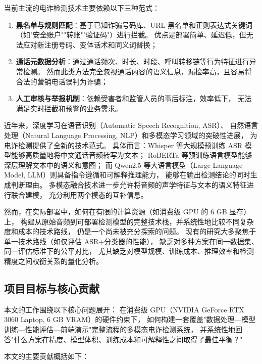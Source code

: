\documentclass[11pt,a4paper]{ctexart}
\begin{document}
当前主流的电诈检测技术主要依赖以下三种范式：

\begin{enumerate}[label=(\arabic*)]
  \item \textbf{黑名单与规则匹配}：基于已知诈骗号码库、URL 黑名单和正则表达式关键词
  （如"安全账户""转账""验证码"）进行拦截。
  优点是部署简单、延迟低，但无法应对新注册号码、变体话术和同义词替换；
  \item \textbf{通话元数据分析}：通过通话频次、时长、时段、呼叫转移链等行为特征进行异常检测。
  然而此类方法完全忽视通话内容的语义信息，漏检率高，且容易将合法的营销电话误判为诈骗；
  \item \textbf{人工审核与举报机制}：依赖受害者和监管人员的事后标注，效率低下，
  无法满足实时拦截和预警的业务需求。
\end{enumerate}

近年来，深度学习在语音识别（Automatic Speech Recognition, ASR）、
自然语言处理（Natural Language Processing, NLP）和多模态学习领域的突破性进展，
为电诈检测提供了全新的技术范式。
具体而言：Whisper 等大规模预训练 ASR 模型能够高质量地将中文通话音频转写为文本；
RoBERTa 等预训练语言模型能够深层理解文本中的语义和意图；
而 Qwen2.5 等大语言模型（Large Language Model, LLM）则具备指令遵循和可解释推理能力，
能够在输出检测结论的同时生成判断理由。
多模态融合技术进一步允许将音频的声学特征与文本的语义特征进行联合建模，
充分利用两个模态的互补信息。

然而，在实际部署中，如何在有限的计算资源（如消费级 GPU 的 6 GB 显存）上，
构建从原始音频到可部署检测模型的完整技术栈，并系统性地比较不同复杂度和成本的技术路线，
仍是一个尚未被充分探索的问题。
现有的研究大多聚焦于单一技术路线（如仅评估 ASR+分类器的性能），
缺乏对多种方案在同一数据集、同一评估标准下的公平对比，
尤其缺乏对模型规模、训练成本、推理效率和检测精度之间权衡关系的量化分析。

\subsection{项目目标与核心贡献}

本文的工作围绕以下核心问题展开：
在消费级 GPU（NVIDIA GeForce RTX 3060 Laptop, 6 GB VRAM）的硬件约束下，
如何构建一套覆盖"数据处理—模型训练—性能评估—前端演示"完整流程的多模态电诈检测系统，
并系统性地回答"什么方案在精度、模型体积、训练成本和可解释性之间取得了最佳平衡？"

本文的主要贡献概括如下：
\end{document}
